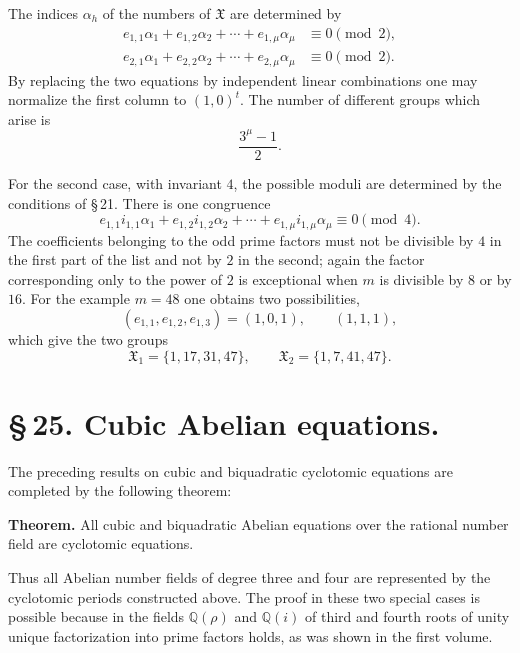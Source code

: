\documentclass[11pt]{article}
\providecommand{\grpX}{\mathfrak X}
\begin{document}
The indices $\alpha_h$ of the numbers of $\grpX$ are determined by
\begin{equation}
\begin{aligned}
 e_{1,1}\alpha_1+e_{1,2}\alpha_2+
    \cdots+e_{1,\mu}\alpha_\mu&\equiv0\pmod2,\\
 e_{2,1}\alpha_1+e_{2,2}\alpha_2+
    \cdots+e_{2,\mu}\alpha_\mu&\equiv0\pmod2.
\end{aligned}
\tag{3}
\end{equation}
By replacing the two equations by independent linear combinations one may normalize the first column to $(1,0)^t$.  The number of different groups which arise is
\begin{equation}
   \frac{3^\mu-1}{2}.
   \tag{4}
\end{equation}

For the second case, with invariant $4$, the possible moduli are determined by the conditions of \S\,21.  There is one congruence
\begin{equation}
   e_{1,1}i_{1,1}\alpha_1+
   e_{1,2}i_{1,2}\alpha_2+
   \cdots+e_{1,\mu}i_{1,\mu}\alpha_\mu\equiv0\pmod4.
   \tag{5}
\end{equation}
The coefficients belonging to the odd prime factors must not be divisible by $4$ in the first part of the list and not by $2$ in the second; again the factor corresponding only to the power of $2$ is exceptional when $m$ is divisible by $8$ or by $16$.  For the example $m=48$ one obtains two possibilities,
\[
 (e_{1,1},e_{1,2},e_{1,3})=(1,0,1),
 \qquad
 (1,1,1),
\]
which give the two groups
\begin{equation}
  \grpX_1=\{1,17,31,47\},
  \qquad
  \grpX_2=\{1,7,41,47\}.
  \tag{6}
\end{equation}

\section*{\S\,25. Cubic Abelian equations.}

The preceding results on cubic and biquadratic cyclotomic equations are completed by the following theorem:

\medskip
\noindent\textbf{Theorem.}  All cubic and biquadratic Abelian equations over the rational number field are cyclotomic equations.

\medskip
Thus all Abelian number fields of degree three and four are represented by the cyclotomic periods constructed above.  The proof in these two special cases is possible because in the fields $\mathbb Q(\rho)$ and $\mathbb Q(i)$ of third and fourth roots of unity unique factorization into prime factors holds, as was shown in the first volume.
\end{document}
